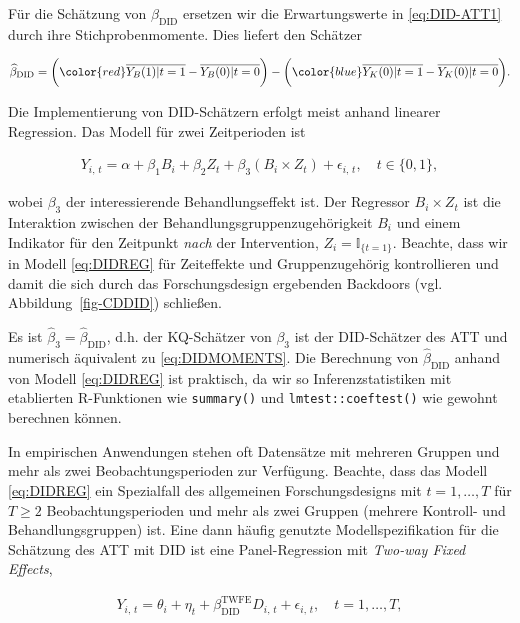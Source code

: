 \documentclass[
  a4paper,
  DIV=11,
  oneside]{scrreprt}
\begin{document}
Für die Schätzung von \(\beta_\text{DID}\) ersetzen wir die
Erwartungswerte in \eqref{eq:DID-ATT1} durch ihre Stichprobenmomente.
Dies liefert den Schätzer

\begin{align}
  \widehat{\beta}_\textup{DID} = \bigg({\color{red}\overline{Y_B(1)\vert t=1} - \overline{Y_B(0)\vert t=0}} \bigg) -  \bigg({\color{blue}\overline{Y_K(0)\vert t=1} - \overline{Y_K(0)\vert t=0}}\bigg). \label{eq:DIDMOMENTS}
\end{align}

Die Implementierung von DID-Schätzern erfolgt meist anhand linearer
Regression. Das Modell für zwei Zeitperioden ist

\begin{align}
  Y_{i,\,t} = \alpha + \beta_1 B_i + \beta_2 Z_t + \beta_3 (B_i \times Z_t) + \epsilon_{i,\,t}, \quad t\in\{0,1\}, \label{eq:DIDREG}
\end{align}

wobei \(\beta_3\) der interessierende Behandlungseffekt ist. Der
Regressor \(B_i \times Z_t\) ist die Interaktion zwischen der
Behandlungsgruppenzugehörigkeit \(B_i\) und einem Indikator für den
Zeitpunkt \emph{nach} der Intervention, \(Z_i = \mathbb{I}_{\{t=1\}}\).
Beachte, dass wir in Modell \eqref{eq:DIDREG} für Zeiteffekte und
Gruppenzugehörig kontrollieren und damit die sich durch das
Forschungsdesign ergebenden Backdoors (vgl. Abbildung~\ref{fig-CDDID})
schließen.

Es ist \(\widehat\beta_3 = \widehat{\beta}_\text{DID}\), d.h. der
KQ-Schätzer von \(\beta_3\) ist der DID-Schätzer des ATT und numerisch
äquivalent zu \eqref{eq:DIDMOMENTS}. Die Berechnung von
\(\widehat\beta_\text{DID}\) anhand von Modell \eqref{eq:DIDREG} ist
praktisch, da wir so Inferenzstatistiken mit etablierten R-Funktionen
wie \texttt{summary()} und \texttt{lmtest::coeftest()} wie gewohnt
berechnen können.

In empirischen Anwendungen stehen oft Datensätze mit mehreren Gruppen
und mehr als zwei Beobachtungsperioden zur Verfügung. Beachte, dass das
Modell \eqref{eq:DIDREG} ein Spezialfall des allgemeinen
Forschungsdesigns mit \(t=1,\dots,T\) für \(T\geq2\)
Beobachtungsperioden und mehr als zwei Gruppen (mehrere Kontroll- und
Behandlungsgruppen) ist. Eine dann häufig genutzte Modellspezifikation
für die Schätzung des ATT mit DID ist eine Panel-Regression mit
\emph{Two-way Fixed Effects},

\begin{align}
  Y_{i,\,t} =  \theta_i + \eta_t + \beta_\text{DID}^\text{TWFE} D_{i,\, t} + \epsilon_{i,\,t}, \quad t = 1,\dots,T, \label{eq:TWFEDIDREG}
\end{align}
\end{document}
